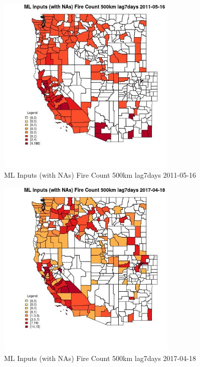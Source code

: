 \begin{figure} 
\centering  
\includegraphics[width=0.77\textwidth]{Code_Outputs/Report_ML_input_PM25_Step4_part_e_de_duplicated_aves_compiled_2019-05-20wNAs_CountyFire_Count_500km_lag7daysMean2011-05-16.jpg} 
\caption{\label{fig:Report_ML_input_PM25_Step4_part_e_de_duplicated_aves_compiled_2019-05-20wNAsCountyFire_Count_500km_lag7daysMean2011-05-16}ML Inputs (with NAs) Fire Count 500km lag7days 2011-05-16} 
\end{figure} 
 

\begin{figure} 
\centering  
\includegraphics[width=0.77\textwidth]{Code_Outputs/Report_ML_input_PM25_Step4_part_e_de_duplicated_aves_compiled_2019-05-20wNAs_CountyFire_Count_500km_lag7daysMean2017-04-18.jpg} 
\caption{\label{fig:Report_ML_input_PM25_Step4_part_e_de_duplicated_aves_compiled_2019-05-20wNAsCountyFire_Count_500km_lag7daysMean2017-04-18}ML Inputs (with NAs) Fire Count 500km lag7days 2017-04-18} 
\end{figure} 
 

